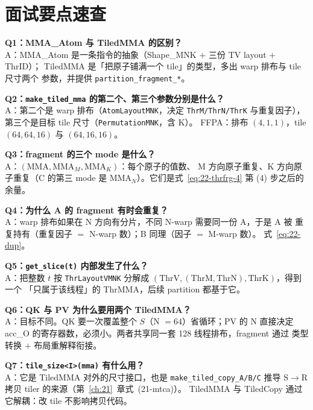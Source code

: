 \section{面试要点速查}

\textbf{Q1：MMA\_Atom 与 TiledMMA 的区别？}\\
A：MMA\_Atom 是一条指令的抽象（Shape\_MNK $+$ 三份 TV layout $+$ ThrID）；
TiledMMA 是「把原子铺满一个 tile」的类型，多出 warp 排布与 tile 尺寸两个
参数，并提供 \texttt{partition\_\allowbreak{}fragment\_\allowbreak{}*}。

\textbf{Q2：\texttt{make\_\allowbreak{}tiled\_\allowbreak{}mma} 的第二个、第三个参数分别是什么？}\\
A：第二个是 warp 排布（\texttt{Atom\allowbreak{}Layout\allowbreak{}MNK}，决定 \texttt{Thr\allowbreak{}M/\allowbreak{}Thr\allowbreak{}N/\allowbreak{}Thr\allowbreak{}K}
与重复因子），第三个是目标 tile 尺寸（\texttt{Permutation\allowbreak{}MNK}，含 K）。
FFPA：排布 $(4,1,1)$，tile $(64,64,16)$ 与 $(64,16,16)$。

\textbf{Q3：fragment 的三个 mode 是什么？}\\
A：$(\mathrm{MMA}, \mathrm{MMA}_M, \mathrm{MMA}_K)$：每个原子的值数、
M 方向原子重复、K 方向原子重复（C 的第三 mode 是
$\mathrm{MMA}_N$）。它们是式~\eqref{eq:22-thrfrg-4} 第 (4) 步之后的余量。

\textbf{Q4：为什么 A 的 fragment 有时会重复？}\\
A：warp 排布如果在 N 方向有分片，不同 N-warp 需要同一份 A，于是 A 被
重复持有（重复因子 $=$ N-warp 数）；B 同理（因子 $=$ M-warp 数）。
式~\eqref{eq:22-dup}。

\textbf{Q5：\texttt{get\_\allowbreak{}slice\allowbreak{}(t)} 内部发生了什么？}\\
A：把整数 $t$ 按 \texttt{Thr\allowbreak{}Layout\allowbreak{}VMNK} 分解成
$(\mathrm{ThrV},(\mathrm{ThrM},\mathrm{ThrN}),\mathrm{ThrK})$，得到一个
「只属于该线程」的 ThrMMA，后续 partition 都基于它。

\textbf{Q6：QK 与 PV 为什么要用两个 TiledMMA？}\\
A：目标不同。QK 要一次覆盖整个 $S$（N $=64$）省循环；PV 的 N 直接决定
acc\_O 的寄存器数，必须小。两者共享同一套 128 线程排布，fragment 通过
类型转换 $+$ 布局重解释衔接。

\textbf{Q7：\texttt{tile\_\allowbreak{}size\allowbreak{}<I>\allowbreak{}(mma)} 有什么用？}\\
A：它是 TiledMMA 对外的尺寸接口，也是 \texttt{make\_\allowbreak{}tiled\_\allowbreak{}copy\_\allowbreak{}A/\allowbreak{}B/\allowbreak{}C}
推导 S$\to$R 拷贝 tiler 的来源（第~\ref{ch:21}~章式~(21-mtca)）。
TiledMMA 与 TiledCopy 通过它解耦：改 tile 不影响拷贝代码。

